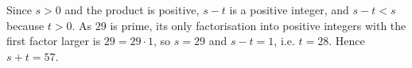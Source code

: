 Since $s>0$ and the product is positive, $s-t$ is a positive integer, and $s-t<s$ because $t>0$. As $29$ is prime, its only factorisation into positive integers with the first factor larger is $29=29\cdot1$, so $s=29$ and $s-t=1$, i.e. $t=28$. Hence $s+t=\boxed{57}$.
